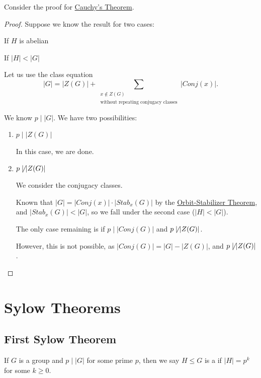 \begin{example}
    Consider the proof for \hyperref[thm:cauchy]{Cauchy's Theorem}.

    \begin{proof}
        Suppose we know the result for two cases:

        \begin{listo}
            \item If $H$ is abelian
            \item If $|H| < |G|$
        \end{listo}

        Let us use the class equation \[
            |G| = |Z(G)| + \sum_{\substack{x \notin Z(G) \\\text{without repeating conjugacy classes}}} | Conj(x) |.
        \]

        We know $p \mid |G|$. We have two possibilities: \begin{enumerate}
            \item $p \mid |Z(G)|$

            In this case, we are done.

            \item $p \not\mid |Z(G)|$

            We consider the conjugacy classes. 

            Known that $|G| = |Conj(x)| \cdot |Stab_x(G)|$ by the \hyperref[thm:orbit-stabilizer]{Orbit-Stabilizer Theorem}, and $|Stab_x(G)| < |G|$, so we fall under the second case ($|H| < |G|$).

            The only case remaining is if $p \mid |Conj(G)|$ and $p \not\mid |Z(G)|$.

            However, this is not possible, as $|Conj(G)| = |G| - |Z(G)|$, and $p \not\mid |Z(G)|$. 
        \end{enumerate}
    \end{proof}
\end{example}

\section{Sylow Theorems}

\subsection{First Sylow Theorem}

\begin{definition}[p-Group]\label{def:p-group}
    If $G$ is a group and $p \mid |G|$ for some prime $p$, then we say $H \leq G$ is a  if $|H| = p^k$ for some $k \geq 0$.
\end{definition}

